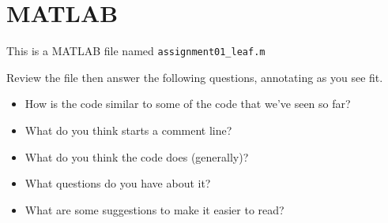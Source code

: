 \documentclass[
]{book}
\providecommand{\tightlist}{%
  \setlength{\itemsep}{0pt}\setlength{\parskip}{0pt}}
\begin{document}
\section{MATLAB}\label{matlab}

This is a MATLAB file named \texttt{assignment01\_leaf.m}

Review the file then answer the following questions, annotating as you see fit.

\begin{itemize}
\tightlist
\item
  How is the code similar to some of the code that we've seen so far?
\item
  What do you think starts a comment line?
\item
  What do you think the code does (generally)?
\item
  What questions do you have about it?
\item
  What are some suggestions to make it easier to read?
\end{itemize}
\end{document}
